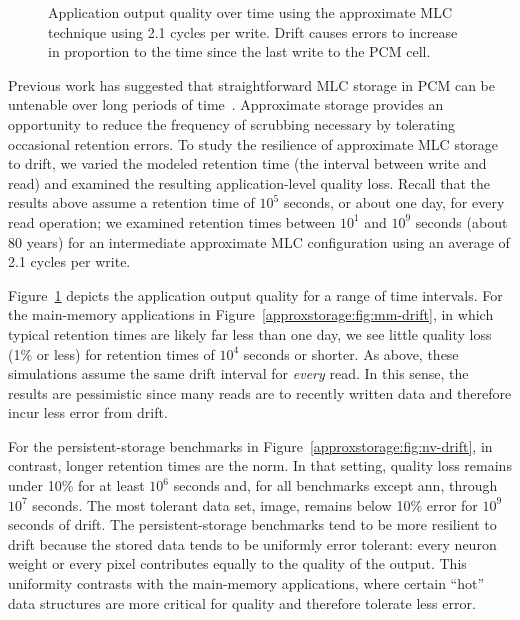 \begin{figure}
    \centering
    \caption{
        Application output quality over time using the approximate MLC
        technique using 2.1 cycles per write.
        Drift causes errors to increase in proportion to the time
        since the last write to the PCM cell.
    }
    \label{approxstorage:fig:drift}
\end{figure}

Previous work has suggested that straightforward MLC storage in PCM can be
untenable over long periods of time~\cite{wdddmlcpcm}.
Approximate storage provides an opportunity to reduce the frequency of
scrubbing necessary by tolerating occasional retention errors.
To study the resilience of approximate MLC storage to drift,
we varied the modeled retention time (the interval between write and read) and
examined the resulting application-level quality loss.
Recall that the results
above assume a retention time of $10^5$ seconds, or about one day, for every
read operation; we examined retention times between $10^1$ and $10^9$ seconds
(about 80 years) for an intermediate approximate MLC configuration using an
average of 2.1 cycles per write.

Figure~\ref{approxstorage:fig:drift} depicts the application output quality for a range of
time intervals.
For the main-memory applications in Figure~\ref{approxstorage:fig:mm-drift}, in which typical retention times are
likely far less than one day, we see little quality loss (1\% or
less) for retention times of $10^4$ seconds or shorter.
As above, these simulations assume the same drift interval for \emph{every}
read.
In this sense, the results are pessimistic since many reads
are to recently written data and therefore incur less error from
drift.

For the
persistent-storage benchmarks in Figure~\ref{approxstorage:fig:nv-drift}, in contrast, longer retention times are the
norm.
In that setting, quality loss remains under 10\% for at least
$10^6$ seconds and, for all benchmarks except \textsf{ann}, through $10^7$ seconds.
The most tolerant data set, \textsf{image}, remains below 10\% error for
$10^9$ seconds of drift.
The persistent-storage benchmarks tend to be more resilient to drift because
the stored data tends to be uniformly error tolerant: every neuron weight or
every pixel contributes equally to the quality of the output.
This uniformity contrasts with the main-memory applications, where certain
``hot'' data structures are more critical for quality and therefore
tolerate less error.

